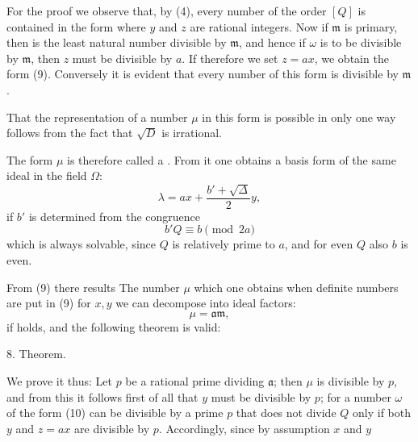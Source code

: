 

For the proof we observe that, by (4), every number of the order $[Q]$ is contained in the form
where $y$ and $z$ are rational integers. Now if $\mathfrak{m}$ is primary, then
is the least natural number divisible by $\mathfrak{m}$, and hence if $\omega$ is to be divisible by $\mathfrak{m}$, then $z$ must be divisible by $a$. If therefore we set $z = ax$, we obtain the form (9). Conversely it is evident that every number of this form is divisible by $\mathfrak{m}$.

That the representation of a number $\mu$ in this form is possible in only one way follows from the fact that $\sqrt{D}$ is irrational.

The form $\mu$ is therefore called a . From it one obtains a basis form of the same ideal in the field $\Omega$:
\[ \lambda = ax + \frac{b' + \sqrt{\Delta}}{2} y, \]
if $b'$ is determined from the congruence
\[ b'Q \equiv b \pmod{2a} \]
which is always solvable, since $Q$ is relatively prime to $a$, and for even $Q$ also $b$ is even.

From (9) there results
The number $\mu$ which one obtains when definite numbers are put in (9) for $x, y$ we can decompose into ideal factors:
\[ \mu = \mathfrak{a}\mathfrak{m}, \]
if
holds, and the following theorem is valid:

8. Theorem. 

We prove it thus: Let $p$ be a rational prime dividing $\mathfrak{a}$; then $\mu$ is divisible by $p$, and from this it follows first of all that $y$ must be divisible by $p$; for a number $\omega$ of the form (10) can be divisible by a prime $p$ that does not divide $Q$ only if both $y$ and $z = ax$ are divisible by $p$. Accordingly, since by assumption $x$ and $y$
